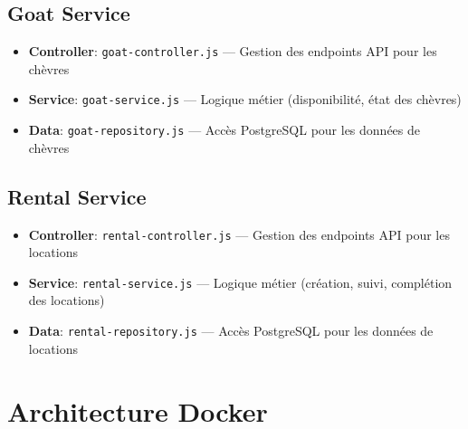 \documentclass[12pt,a4paper]{report}
\begin{document}
\subsection{Goat Service}
\begin{itemize}[leftmargin=*]
    \item \textbf{Controller}: \texttt{goat-controller.js} --- Gestion des endpoints API pour les chèvres
    \item \textbf{Service}: \texttt{goat-service.js} --- Logique métier (disponibilité, état des chèvres)
    \item \textbf{Data}: \texttt{goat-repository.js} --- Accès PostgreSQL pour les données de chèvres
\end{itemize}

\subsection{Rental Service}
\begin{itemize}[leftmargin=*]
    \item \textbf{Controller}: \texttt{rental-controller.js} --- Gestion des endpoints API pour les locations
    \item \textbf{Service}: \texttt{rental-service.js} --- Logique métier (création, suivi, complétion des locations)
    \item \textbf{Data}: \texttt{rental-repository.js} --- Accès PostgreSQL pour les données de locations
\end{itemize}

\section{Architecture Docker}
\end{document}
